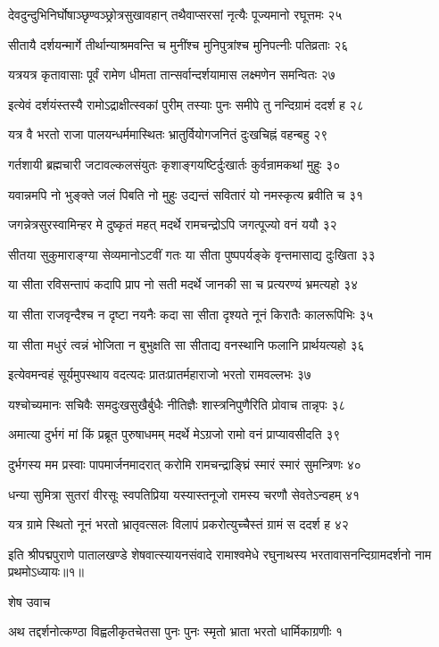 देवदुन्दुभिनिर्घोषाञ्छृण्वञ्छ्रोत्रसुखावहान्
तथैवाप्सरसां नृत्यैः पूज्यमानो रघूत्तमः २५

सीतायै दर्शयन्मार्गे तीर्थान्याश्रमवन्ति च
मुनींश्च मुनिपुत्रांश्च मुनिपत्नीः पतिव्रताः २६

यत्रयत्र कृतावासाः पूर्वं रामेण धीमता
तान्सर्वान्दर्शयामास लक्ष्मणेन समन्वितः २७

इत्येवं दर्शयंस्तस्यै रामोऽद्राक्षीत्स्वकां पुरीम्
तस्याः पुनः समीपे तु नन्दिग्रामं ददर्श ह २८

यत्र वै भरतो राजा पालयन्धर्ममास्थितः
भ्रातुर्वियोगजनितं दुःखचिह्नं वहन्बहु २९

गर्तशायी ब्रह्मचारी जटावल्कलसंयुतः
कृशाङ्गयष्टिर्दुःखार्तः कुर्वन्रामकथां मुहुः ३०

यवान्नमपि नो भुङ्क्ते जलं पिबति नो मुहुः
उद्यन्तं सवितारं यो नमस्कृत्य ब्रवीति च ३१

जगन्नेत्रसुरस्वामिन्हर मे दुष्कृतं महत्
मदर्थे रामचन्द्रोऽपि जगत्पूज्यो वनं ययौ ३२

सीतया सुकुमाराङ्ग्या सेव्यमानोऽटवीं गतः
या सीता पुष्पपर्यङ्के वृन्तमासाद्य दुःखिता ३३

या सीता रविसन्तापं कदापि प्राप नो सती
मदर्थे जानकी सा च प्रत्यरण्यं भ्रमत्यहो ३४

या सीता राजवृन्दैश्च न दृष्टा नयनैः कदा
सा सीता दृश्यते नूनं किरातैः कालरूपिभिः ३५

या सीता मधुरं त्वन्नं भोजिता न बुभुक्षति
सा सीताद्य वनस्थानि फलानि प्रार्थयत्यहो ३६

इत्येवमन्वहं सूर्यमुपस्थाय वदत्यदः
प्रातःप्रातर्महाराजो भरतो रामवल्लभः ३७

यश्चोच्यमानः सचिवैः समदुःखसुखैर्बुधैः
नीतिज्ञैः शास्त्रनिपुणैरिति प्रोवाच तान्नृपः ३८

अमात्या दुर्भगं मां किं प्रब्रूत पुरुषाधमम्
मदर्थे मेऽग्रजो रामो वनं प्राप्यावसीदति ३९

दुर्भगस्य मम प्रस्वाः पापमार्जनमादरात्
करोमि रामचन्द्राङ्घ्रिं स्मारं स्मारं सुमन्त्रिणः ४०

धन्या सुमित्रा सुतरां वीरसूः स्वपतिप्रिया
यस्यास्तनूजो रामस्य चरणौ सेवतेऽन्वहम् ४१

यत्र ग्रामे स्थितो नूनं भरतो भ्रातृवत्सलः
विलापं प्रकरोत्युच्चैस्तं ग्रामं स ददर्श ह ४२

इति श्रीपद्मपुराणे पातालखण्डे शेषवात्स्यायनसंवादे रामाश्वमेधे रघुनाथस्य भरतावासनन्दिग्रामदर्शनो नाम प्रथमोऽध्यायः॥१॥


शेष उवाच

अथ तद्दर्शनोत्कण्ठा विह्वलीकृतचेतसा
पुनः पुनः स्मृतो भ्राता भरतो धार्मिकाग्रणीः १

